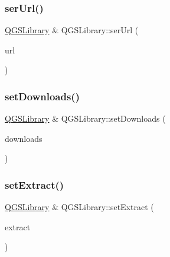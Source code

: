 \mbox{\label{class_q_g_s_library_a28d9c7df68ef5e305c737785de4e3fc6}} 
\subsubsection{\texorpdfstring{ser\+Url()}{serUrl()}}
{\footnotesize\ttfamily \mbox{\hyperlink{class_q_g_s_library}{Q\+G\+S\+Library}} \& Q\+G\+S\+Library\+::ser\+Url (\begin{DoxyParamCaption}\item[{const Q\+Url \&}]{url }\end{DoxyParamCaption})}

\mbox{\label{class_q_g_s_library_a530510fc01c2e9e7ddcfb70776938f94}} 
\subsubsection{\texorpdfstring{set\+Downloads()}{setDownloads()}}
{\footnotesize\ttfamily \mbox{\hyperlink{class_q_g_s_library}{Q\+G\+S\+Library}} \& Q\+G\+S\+Library\+::set\+Downloads (\begin{DoxyParamCaption}\item[{const \mbox{\hyperlink{class_q_g_s_downloads}{Q\+G\+S\+Downloads}} \&}]{downloads }\end{DoxyParamCaption})}

\mbox{\label{class_q_g_s_library_a26581d7337d9ec2d81e6ed3c5845397d}} 
\subsubsection{\texorpdfstring{set\+Extract()}{setExtract()}}
{\footnotesize\ttfamily \mbox{\hyperlink{class_q_g_s_library}{Q\+G\+S\+Library}} \& Q\+G\+S\+Library\+::set\+Extract (\begin{DoxyParamCaption}\item[{const \mbox{\hyperlink{class_q_g_s_extract}{Q\+G\+S\+Extract}} \&}]{extract }\end{DoxyParamCaption})}


